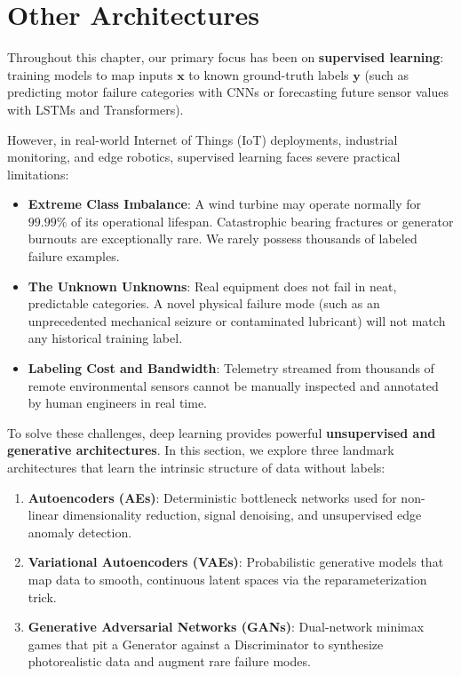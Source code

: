 \section{Other Architectures}\label{sec:other_architectures}

Throughout this chapter, our primary focus has been on \textbf{supervised learning}: training models to map inputs $\mathbf{x}$ to known ground-truth labels $\mathbf{y}$ (such as predicting motor failure categories with CNNs or forecasting future sensor values with LSTMs and Transformers).

However, in real-world Internet of Things (IoT) deployments, industrial monitoring, and edge robotics, supervised learning faces severe practical limitations:
\begin{itemize}
    \item \textbf{Extreme Class Imbalance}: A wind turbine may operate normally for $99.99\%$ of its operational lifespan. Catastrophic bearing fractures or generator burnouts are exceptionally rare. We rarely possess thousands of labeled failure examples.
    \item \textbf{The Unknown Unknowns}: Real equipment does not fail in neat, predictable categories. A novel physical failure mode (such as an unprecedented mechanical seizure or contaminated lubricant) will not match any historical training label.
    \item \textbf{Labeling Cost and Bandwidth}: Telemetry streamed from thousands of remote environmental sensors cannot be manually inspected and annotated by human engineers in real time.
\end{itemize}

To solve these challenges, deep learning provides powerful \textbf{unsupervised and generative architectures}. In this section, we explore three landmark architectures that learn the intrinsic structure of data without labels:
\begin{enumerate}
    \item \textbf{Autoencoders (AEs)}: Deterministic bottleneck networks used for non-linear dimensionality reduction, signal denoising, and unsupervised edge anomaly detection.
    \item \textbf{Variational Autoencoders (VAEs)}: Probabilistic generative models that map data to smooth, continuous latent spaces via the reparameterization trick.
    \item \textbf{Generative Adversarial Networks (GANs)}: Dual-network minimax games that pit a Generator against a Discriminator to synthesize photorealistic data and augment rare failure modes.
\end{enumerate}

